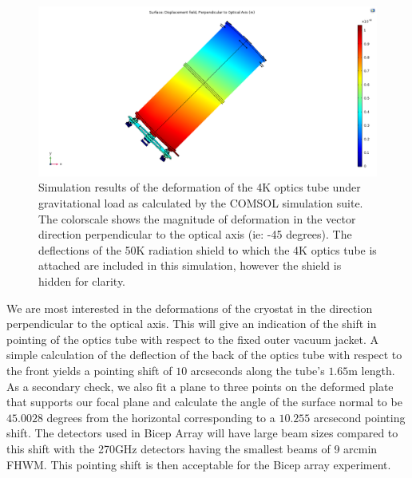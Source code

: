 \documentclass[12pt]{article}
\begin{document}
\begin{figure}
	\center
	\includegraphics[width=.9\textwidth]{disp_45_perp_4_shell.png}
	\caption{Simulation results of the deformation of the 4K optics tube under
	gravitational load as calculated by the COMSOL simulation suite. The
	colorscale shows the magnitude of deformation in the vector direction
	perpendicular to the optical axis (ie: -45 degrees). The deflections of
	the 50K radiation shield to which the 4K optics tube is attached are
	included in this simulation, however the shield is hidden for clarity.}
	\label{fig:pointing}
\end{figure}



We are most interested in the deformations of the cryostat in the direction
perpendicular to the optical axis. This will give an indication of the shift
in pointing of the optics tube with respect to the fixed outer vacuum jacket.
A simple calculation of the deflection of the back of the optics tube with
respect to the front yields a pointing shift of $10$ arcseconds along the
tube's $1.65$m length. As a secondary check, we also fit a plane to three
points on the deformed plate that supports our focal plane and calculate the angle of the surface normal
to be $45.0028$ degrees from the horizontal corresponding to a $10.255$ arcsecond pointing shift.
The detectors used in Bicep Array will have large beam sizes compared to this
shift with the 270GHz detectors having the smallest beams of 9 arcmin FHWM.
This pointing shift is then acceptable for the Bicep array experiment.
\end{document}

